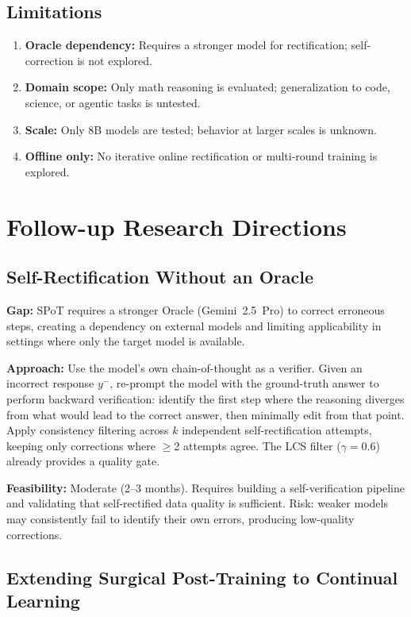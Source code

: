 \documentclass[11pt]{article}
\begin{document}
\subsection{Limitations}

\begin{enumerate}
    \item \textbf{Oracle dependency:} Requires a stronger model for rectification; self-correction is not explored.
    \item \textbf{Domain scope:} Only math reasoning is evaluated; generalization to code, science, or agentic tasks is untested.
    \item \textbf{Scale:} Only 8B models are tested; behavior at larger scales is unknown.
    \item \textbf{Offline only:} No iterative online rectification or multi-round training is explored.
\end{enumerate}

\section{Follow-up Research Directions}

\subsection{Self-Rectification Without an Oracle}

\textbf{Gap:} SPoT requires a stronger Oracle (Gemini~2.5~Pro) to correct erroneous steps, creating a dependency on external models and limiting applicability in settings where only the target model is available.

\textbf{Approach:} Use the model's own chain-of-thought as a verifier. Given an incorrect response $y^-$, re-prompt the model with the ground-truth answer to perform backward verification: identify the first step where the reasoning diverges from what would lead to the correct answer, then minimally edit from that point. Apply consistency filtering across $k$ independent self-rectification attempts, keeping only corrections where $\geq$2 attempts agree. The LCS filter ($\gamma{=}0.6$) already provides a quality gate.

\textbf{Feasibility:} Moderate (2--3 months). Requires building a self-verification pipeline and validating that self-rectified data quality is sufficient. Risk: weaker models may consistently fail to identify their own errors, producing low-quality corrections.

\subsection{Extending Surgical Post-Training to Continual Learning}
\end{document}
